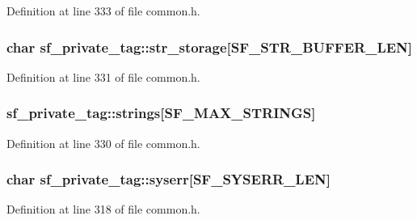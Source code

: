 Definition at line 333 of file common.\+h.

\subsubsection[{\texorpdfstring{str\+\_\+storage}{str_storage}}]{\setlength{\rightskip}{0pt plus 5cm}char sf\+\_\+private\+\_\+tag\+::str\+\_\+storage\mbox{[}{\bf S\+F\+\_\+\+S\+T\+R\+\_\+\+B\+U\+F\+F\+E\+R\+\_\+\+L\+EN}\mbox{]}}\hypertarget{structsf__private__tag_ad4bab3e88a0122b384d6afb50380cd73}{}\label{structsf__private__tag_ad4bab3e88a0122b384d6afb50380cd73}


Definition at line 331 of file common.\+h.

\subsubsection[{\texorpdfstring{strings}{strings}}]{ sf\+\_\+private\+\_\+tag\+::strings\mbox{[}{\bf S\+F\+\_\+\+M\+A\+X\+\_\+\+S\+T\+R\+I\+N\+GS}\mbox{]}}\hypertarget{structsf__private__tag_a65b23e105d51eaa8b0d8029a2e64d641}{}\label{structsf__private__tag_a65b23e105d51eaa8b0d8029a2e64d641}


Definition at line 330 of file common.\+h.

\subsubsection[{\texorpdfstring{syserr}{syserr}}]{\setlength{\rightskip}{0pt plus 5cm}char sf\+\_\+private\+\_\+tag\+::syserr\mbox{[}{\bf S\+F\+\_\+\+S\+Y\+S\+E\+R\+R\+\_\+\+L\+EN}\mbox{]}}\hypertarget{structsf__private__tag_ae421e30047accc95f5f0237b0988af87}{}\label{structsf__private__tag_ae421e30047accc95f5f0237b0988af87}


Definition at line 318 of file common.\+h.


